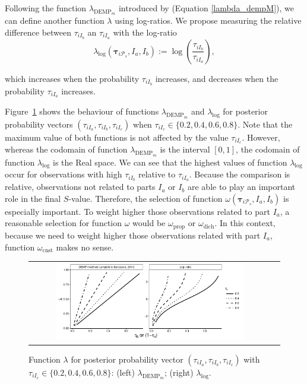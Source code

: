 \documentclass[submit]{smj}
\theoremstyle{definition}
\newcommand{\m}[1]{\boldsymbol{#1}}
\begin{document}
Following the function $\lambda_{\text{DEMP}_m}$ introduced by \cite{longford2014} (Equation \ref{lambda_dempM}), we can define another function $\lambda$ using log-ratios. We propose  measuring the relative difference between $\tau_{iI_b}$ an $\tau_{iI_a}$ with the log-ratio
\[
\lambda_{\log}(\m\tau_{i \mathcal{P}_s},  I_a,  I_b) := \log \left(\frac{ \tau_{iI_b} }{ \tau_{iI_a} }\right),
\]

which increases when the probability $\tau_{iI_b}$ increases, and decreases when the probability $\tau_{iI_a}$ increases.

Figure~\ref{nonsymetric} shows the behaviour of functions $\lambda_{\text{DEMP}_m}$ and $\lambda_{\log}$ for posterior probability vectors $\left(\tau_{iI_a}, \tau_{iI_b}, \tau_{iI_c}\right)$ when $\tau_{iI_c} \in \{0.2, 0.4, 0.6, 0.8\}$. Note that the maximum value of both functions is not affected by the value $\tau_{iI_c}$. However, whereas the codomain of  function $\lambda_{\text{DEMP}_m}$ is the interval $[0,1]$, the codomain of function $\lambda_{\log}$ is the Real space. We can see that the highest values of function $\lambda_{\log}$ occur for observations with high $\tau_{iI_b}$ relative to $\tau_{iI_a}$. Because the comparison is relative, observations not related to parts $I_a$ or $I_b$ are able to play an important role in the final $S$-value. Therefore, the selection of function $\omega(\m\tau_{i \mathcal{P}_s},  I_a,  I_b)$ is especially important. To weight higher those observations related to part $I_a$, a reasonable selection for function $\omega$ would be $\omega_{\text{prop}}$ or $\omega_{\text{dich}}$. In this context, because we need to weight higher those observations related with part $I_a$, function $\omega_{\text{cnst}}$ makes no sense.

\begin{figure}[htpb]
\begin{center}
\begin{tabular}{cc}
  \includegraphics[width=0.8\textwidth]{figures/demp2_log.pdf} \\
 \end{tabular}
 \caption{Function $\lambda$ for posterior probability vector $\left(\tau_{iI_a}, \tau_{iI_b}, \tau_{iI_c} \right)$ with $\tau_{iI_c} \in \{0.2, 0.4, 0.6, 0.8\}$: (left) $\lambda_{\text{DEMP}_m}$; (right) $\lambda_{\log}$.} 
\label{nonsymetric}
\end{center}
\end{figure}
\end{document}
